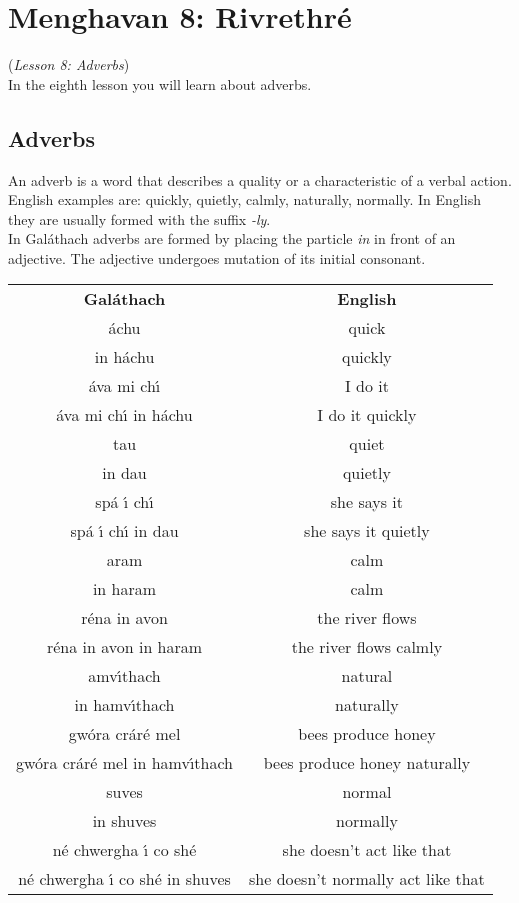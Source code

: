 \section{Menghavan 8: Rivrethr\'{e}}
(\textit{Lesson 8: Adverbs})\\

In the eighth lesson you will learn about adverbs.

\subsection{Adverbs}

An adverb is a word that describes a quality or a characteristic of a verbal action.\\
English examples are: quickly, quietly, calmly, naturally, normally. In English they are usually formed with the suffix \textit{-ly}.\\
In Gal\'{a}thach adverbs are formed by placing the particle \textit{in} in front of an adjective. The adjective undergoes mutation of its initial consonant.
\begin{table}[H]
\centering
\begin{tabular}{cc}
  \toprule
  \textbf{Gal\'{a}thach} & \textbf{English}\\
  \cmidrule(lr){1-1}\cmidrule(lr){2-2}
  \'{a}chu & quick\\
  in h\'{a}chu & quickly\\
  \'{a}va mi ch\'{\i} & I do it\\
  \'{a}va mi ch\'{\i} in h\'{a}chu & I do it quickly\\
  \cmidrule(lr){1-1}\cmidrule(lr){2-2}
  tau & quiet\\
  in dau & quietly\\
  sp\'{a} \'{\i} ch\'{\i} & she says it\\
  sp\'{a} \'{\i} ch\'{\i} in dau & she says it quietly\\
  \cmidrule(lr){1-1}\cmidrule(lr){2-2}
  aram & calm\\
  in haram & calm\\
  r\'{e}na in avon & the river flows\\
  r\'{e}na in avon in haram & the river flows calmly\\
  \cmidrule(lr){1-1}\cmidrule(lr){2-2}
  amv\'{\i}thach & natural\\
  in hamv\'{\i}thach & naturally\\
  gw\'{o}ra cr\'{a}r\'{e} mel & bees produce honey\\
  gw\'{o}ra cr\'{a}r\'{e} mel in hamv\'{\i}thach & bees produce honey naturally\\
  \cmidrule(lr){1-1}\cmidrule(lr){2-2}
  suves & normal\\
  in shuves & normally\\
  n\'{e} chwergha \'{\i} co sh\'{e} & she doesn't act like that\\
  n\'{e} chwergha \'{\i} co sh\'{e} in shuves & she doesn't normally act like that\\
  \bottomrule
\end{tabular}
\label{examples_adverb}
\end{table}


